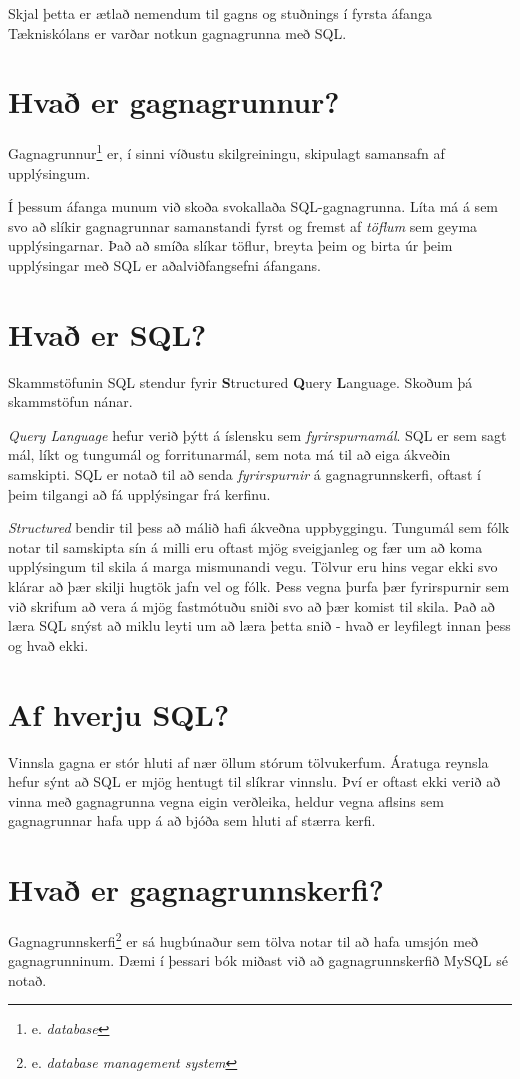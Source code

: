 Skjal þetta er ætlað nemendum til gagns og stuðnings í fyrsta áfanga Tækniskólans er varðar notkun gagnagrunna með SQL.
\section{Hvað er gagnagrunnur?}
Gagnagrunnur\footnote{e. \emph{database}} er, í sinni víðustu skilgreiningu, skipulagt samansafn af upplýsingum.

Í þessum áfanga munum við skoða svokallaða SQL-gagnagrunna.
Líta má á sem svo að slíkir gagnagrunnar samanstandi fyrst og fremst af \emph{töflum} sem geyma upplýsingarnar. Það að smíða slíkar töflur, breyta þeim og birta úr þeim upplýsingar með SQL er aðalviðfangsefni áfangans.
\section{Hvað er SQL?}
Skammstöfunin SQL stendur fyrir \textbf{S}tructured \textbf{Q}uery \textbf{L}anguage. Skoðum þá skammstöfun nánar.

\emph{Query Language} hefur verið þýtt á íslensku sem \emph{fyrirspurnamál}. SQL er sem sagt mál, líkt og tungumál og forritunarmál, sem nota má til að eiga ákveðin samskipti. SQL er notað til að senda \emph{fyrirspurnir} á gagnagrunnskerfi, oftast í þeim tilgangi að fá upplýsingar frá kerfinu.

\emph{Structured} bendir til þess að málið hafi ákveðna uppbyggingu. Tungumál sem fólk notar til samskipta sín á milli eru oftast mjög sveigjanleg og fær um að koma upplýsingum til skila á marga mismunandi vegu. Tölvur eru hins vegar ekki svo klárar að þær skilji hugtök jafn vel og fólk. Þess vegna þurfa þær fyrirspurnir sem við skrifum að vera á mjög fastmótuðu sniði svo að þær komist til skila. Það að læra SQL snýst að miklu leyti um að læra þetta snið - hvað er leyfilegt innan þess og hvað ekki.
\section{Af hverju SQL?}
Vinnsla gagna er stór hluti af nær öllum stórum tölvukerfum. Áratuga reynsla hefur sýnt að SQL er mjög hentugt til slíkrar vinnslu. Því er oftast ekki verið að vinna með gagnagrunna vegna eigin verðleika, heldur vegna aflsins sem gagnagrunnar hafa upp á að bjóða sem hluti af stærra kerfi.
\section{Hvað er gagnagrunnskerfi?}
\label{undirkafli:gagnagrunnskerfi}
Gagnagrunnskerfi\footnote{e. \emph{database management system}} er sá hugbúnaður sem tölva notar til að hafa umsjón með gagnagrunninum. Dæmi í þessari bók miðast við að gagnagrunnskerfið MySQL sé notað.

